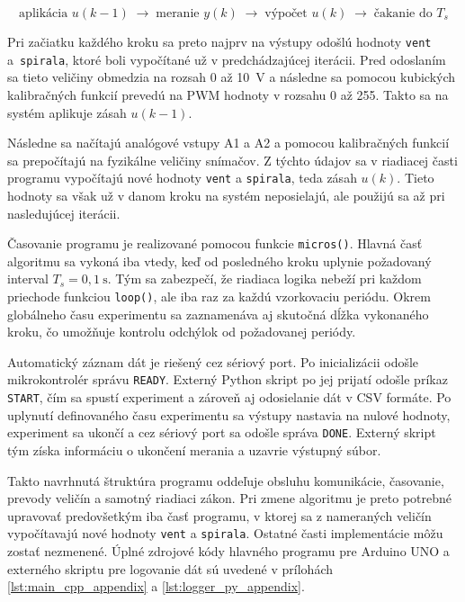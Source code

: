 \begin{center}
\[
\boxed{\text{aplikácia }u(k-1)}
\;\longrightarrow\;
\boxed{\text{meranie }y(k)}
\;\longrightarrow\;
\boxed{\text{výpočet }u(k)}
\;\longrightarrow\;
\boxed{\text{čakanie do }T_s}
\]
\end{center}

\bigskip

Pri začiatku každého kroku sa preto najprv na výstupy odošlú hodnoty
\texttt{vent} a~\texttt{spirala}, ktoré boli vypočítané už v predchádzajúcej iterácii.
Pred odoslaním sa tieto veličiny obmedzia na rozsah 0 až 10~V a následne sa
pomocou kubických kalibračných funkcií prevedú na PWM hodnoty v rozsahu
0 až 255. Takto sa na systém aplikuje zásah $u(k-1)$.

Následne sa načítajú analógové vstupy A1 a A2 a pomocou kalibračných funkcií sa
prepočítajú na fyzikálne veličiny snímačov. Z týchto údajov sa v riadiacej časti
programu vypočítajú nové hodnoty \texttt{vent} a \texttt{spirala}, teda zásah $u(k)$.
Tieto hodnoty sa však už v danom kroku na systém neposielajú, ale použijú sa až
pri nasledujúcej iterácii. 


Časovanie programu je realizované pomocou funkcie \texttt{micros()}.
Hlavná časť algoritmu sa vykoná iba vtedy, keď od posledného kroku uplynie
požadovaný interval $T_s = 0{,}1~\mathrm{s}$. Tým sa zabezpečí, že riadiaca logika
nebeží pri každom priechode funkciou \texttt{loop()}, ale iba raz za každú
vzorkovaciu periódu. Okrem globálneho času experimentu sa zaznamenáva aj
skutočná dĺžka vykonaného kroku, čo umožňuje kontrolu odchýlok od požadovanej
periódy.

Automatický záznam dát je riešený cez sériový port. Po inicializácii odošle
mikrokontrolér správu \texttt{READY}. Externý Python skript po jej prijatí
odošle príkaz \texttt{START}, čím sa spustí experiment a zároveň aj odosielanie
dát v CSV formáte. Po uplynutí definovaného času experimentu sa výstupy nastavia
na nulové hodnoty, experiment sa ukončí a cez sériový port sa odošle správa
\texttt{DONE}. Externý skript tým získa informáciu o ukončení merania a uzavrie
výstupný súbor.

Takto navrhnutá štruktúra programu oddeľuje obsluhu komunikácie, časovanie,
prevody veličín a samotný riadiaci zákon. Pri zmene algoritmu je preto potrebné
upravovať predovšetkým iba časť programu, v ktorej sa z nameraných veličín
vypočítavajú nové hodnoty \texttt{vent} a \texttt{spirala}. Ostatné časti implementácie
môžu zostať nezmenené. Úplné zdrojové kódy hlavného programu pre
Arduino UNO a externého skriptu pre logovanie dát sú uvedené v prílohách
\ref{lst:main_cpp_appendix} a \ref{lst:logger_py_appendix}.

